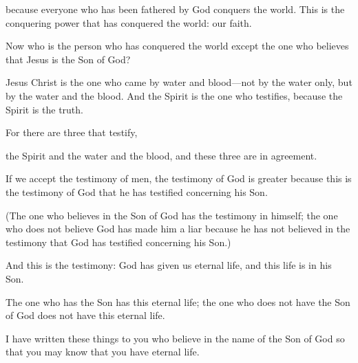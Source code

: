 \begin{scripture}
 because everyone who has been fathered by God conquers the world. This is the conquering power that has conquered the world: our faith.
 Now who is the person who has conquered the world except the one who believes that Jesus is the Son of God?
 Jesus Christ is the one who came by water and blood---not by the water only, but by the water and the blood. And the Spirit is the one who testifies, because the Spirit is the truth.
 For there are three that testify,
 the Spirit and the water and the blood, and these three are in agreement.
\everypar{}

 If we accept the testimony of men, the testimony of God is greater because this is the testimony of God that he has testified concerning his Son.
 (The one who believes in the Son of God has the testimony in himself; the one who does not believe God has made him a liar because he has not believed in the testimony that God has testified concerning his Son.)
 And this is the testimony: God has given us eternal life, and this life is in his Son.
 The one who has the Son has this eternal life; the one who does not have the Son of God does not have this eternal life.
\everypar{}

 I have written these things to you who believe in the name of the Son of God so that you may know that you have eternal life.
\everypar{}


\end{scripture}
